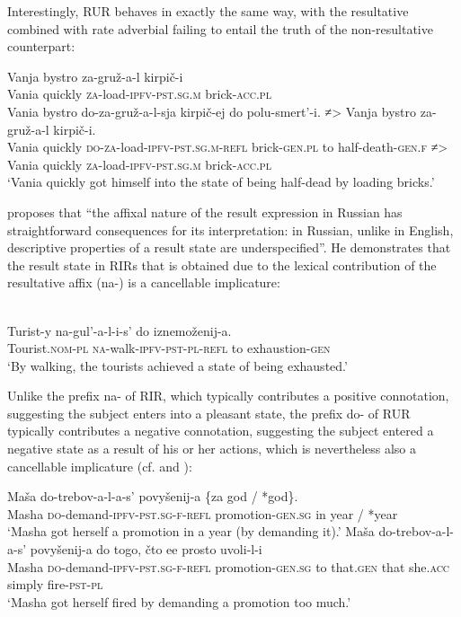 \documentclass[output=paper,colorlinks,citecolor=brown,modfonts,nonflat]{langsci/langscibook}
\begin{document}
Interestingly, RUR behaves in exactly the same way, with the resultative combined with rate adverbial failing to entail the truth of the non-resultative counterpart:

\ea%
    \label{ex:antonyuk:41}
    \ea \label{ex:antonyuk:41a}
    \gll    Vanja bystro za-gruž-a-l kirpič-i\\
            Vania quickly \textsc{za-}load\textsc{-ipfv-pst.sg.m} brick\textsc{-acc.pl}\\
    \ex \label{ex:antonyuk:41b}
    \gll    Vania bystro do-za-gruž-a-l-sja kirpič-ej do polu-smert’-i. ≠> 	Vanja bystro za-gruž-a-l kirpič-i.\\
            Vania quickly \textsc{do-za-}load\textsc{-ipfv-pst.sg.m-refl} brick\textsc{-gen.pl} to half-death\textsc{-gen.f} ≠> Vania	quickly \textsc{za-}load\textsc{-ipfv-pst.sg.m}  brick\textsc{-acc.pl}\\
    \glt    `Vania quickly got himself into the state of being half-dead by loading bricks.'
    \z
\z

\citeauthor{Tatevosov2010} proposes that “the affixal nature of the result expression in Russian has straightforward consequences for its interpretation: in Russian, unlike in English, descriptive properties of a result state are underspecified”. He demonstrates that the result state in RIRs that is obtained due to the lexical contribution of the resultative affix ({na}{}-) is a cancellable implicature:

\ea%
    \label{ex:antonyuk:42}
    \citep{Tatevosov2010}\\
    \gll    Turist-y na-gul’-a-l-i-s’ do iznemoženij-a. \\
            Tourist\textsc{.nom-pl} \textsc{na-}walk\textsc{-ipfv-pst-pl-refl} to exhaustion\textsc{-gen}\\
    \glt    `By walking, the tourists achieved a state of being exhausted.'
    \z

Unlike the prefix {na}{}- of RIR, which typically contributes a positive connotation, suggesting the subject enters into a pleasant state, the prefix {do{}-} of RUR typically contributes a negative connotation, suggesting the subject entered a negative state as a result of his or her actions, which is nevertheless also a cancellable implicature (cf.  and ):


\ea%
    \label{ex:antonyuk:43}
    \ea \label{ex:antonyuk:43a}
    \gll    Maša do-trebov-a-l-a-s’ povyšenij-a \{za god / *god\}.\\
            Masha \textsc{do-}demand\textsc{-ipfv-pst.sg-f-refl} promotion\textsc{-gen.sg} in year / *year\\
    \glt    `Masha got herself a promotion in a year (by demanding it).'
    \ex \label{ex:antonyuk:43b}
    \gll    Maša do-trebov-a-l-a-s’ povyšenij-a	do togo, čto ee prosto uvoli-l-i\\
            Masha \textsc{do-}demand\textsc{-ipfv-pst.sg-f-refl} promotion\textsc{-gen.sg} to that\textsc{.gen} that she\textsc{.acc} simply fire\textsc{-pst-pl}\\
    \glt    `Masha got herself fired by demanding a promotion too much.'
    \z
\z
\end{document}
